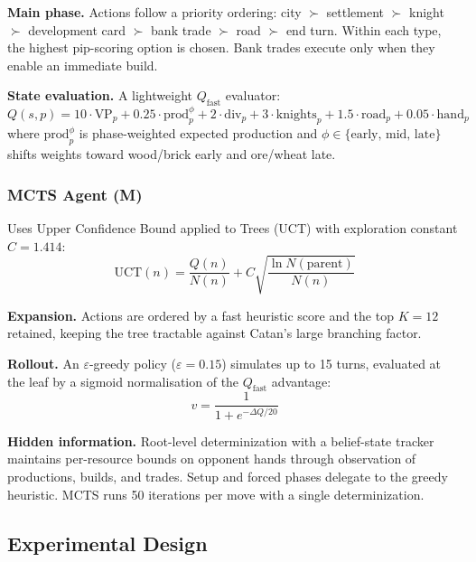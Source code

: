 \documentclass[12pt,a4paper]{article}
\begin{document}
{\textbf{Main phase.} Actions follow a priority ordering: city $\succ$
settlement $\succ$ knight $\succ$ development card $\succ$ bank trade
$\succ$ road $\succ$ end turn. Within each type, the highest pip-scoring
option is chosen. Bank trades execute only when they enable an immediate
build.

\textbf{State evaluation.} A lightweight $Q_{\text{fast}}$ evaluator:
\begin{equation}
  Q(s, p) = 10 \cdot \text{VP}_p
           + 0.25 \cdot \text{prod}_p^{\phi}
           + 2 \cdot \text{div}_p
           + 3 \cdot \text{knights}_p
           + 1.5 \cdot \text{road}_p
           + 0.05 \cdot \text{hand}_p
  \label{eq:qfast}
\end{equation}
where $\text{prod}_p^{\phi}$ is phase-weighted expected production and
$\phi \in \{\text{early, mid, late}\}$ shifts weights toward wood/brick
early and ore/wheat late.

\subsubsection{MCTS Agent (M)}

Uses Upper Confidence Bound applied to Trees (UCT)
\cite{kocsis2006bandit} with exploration constant $C = 1.414$:
\begin{equation}
  \text{UCT}(n) = \frac{Q(n)}{N(n)} + C \sqrt{\frac{\ln N(\text{parent})}{N(n)}}
  \label{eq:uct}
\end{equation}

\textbf{Expansion.} Actions are ordered by a fast heuristic score and
the top $K = 12$ retained, keeping the tree tractable against Catan's
large branching factor.

\textbf{Rollout.} An $\varepsilon$-greedy policy ($\varepsilon = 0.15$)
simulates up to 15 turns, evaluated at the leaf by a sigmoid
normalisation of the $Q_{\text{fast}}$ advantage:
\begin{equation}
  v = \frac{1}{1 + e^{-\Delta Q / 20}}
  \label{eq:sigmoid}
\end{equation}

\textbf{Hidden information.} Root-level determinization with a
belief-state tracker maintains per-resource bounds on opponent hands
through observation of productions, builds, and trades. Setup and forced
phases delegate to the greedy heuristic. MCTS runs 50 iterations per
move with a single determinization.

\subsection{Experimental Design}

}
\end{document}
